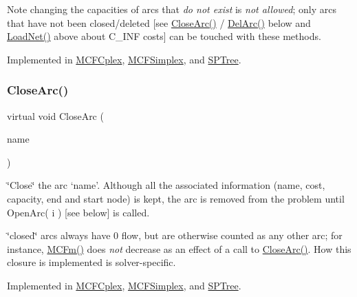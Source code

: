 \begin{DoxyNote}{Note}
changing the capacities of arcs that {\itshape do not exist} is {\itshape not allowed}; only arcs that have not been closed/deleted \mbox{[}see \mbox{\hyperlink{class_m_c_f_class_ae1c33ba491b57343fbc157123fff5b11}{Close\+Arc()}} / \mbox{\hyperlink{class_m_c_f_class_ae291d6625ff31a5fdcc1ef166e2dee34}{Del\+Arc()}} below and \mbox{\hyperlink{class_m_c_f_class_a8d82d26f7845eb69081c860e14c3dc4c}{Load\+Net()}} above about C\+\_\+\+I\+NF costs\mbox{]} can be touched with these methods. 
\end{DoxyNote}


Implemented in \mbox{\hyperlink{class_m_c_f_cplex_a238981895a2a951e54f9dbabd175728f}{M\+C\+F\+Cplex}}, \mbox{\hyperlink{class_m_c_f_simplex_a238981895a2a951e54f9dbabd175728f}{M\+C\+F\+Simplex}}, and \mbox{\hyperlink{class_s_p_tree_a38b4cffe29b722d2552f11022a78227d}{S\+P\+Tree}}.

\mbox{\label{class_m_c_f_class_ae1c33ba491b57343fbc157123fff5b11}} 
\subsubsection{\texorpdfstring{Close\+Arc()}{CloseArc()}}
{\footnotesize\ttfamily virtual void Close\+Arc (\begin{DoxyParamCaption}\item[{\mbox{\hyperlink{class_m_c_f_class_a76aaabb20535c51a2752b93f6c38fe54}{c\+Index}}}]{name }\end{DoxyParamCaption})\hspace{0.3cm}{\ttfamily [pure virtual]}}

\char`\"{}\+Close\char`\"{} the arc `name'. Although all the associated information (name, cost, capacity, end and start node) is kept, the arc is removed from the problem until Open\+Arc( i ) \mbox{[}see below\mbox{]} is called.

\char`\"{}closed\char`\"{} arcs always have 0 flow, but are otherwise counted as any other arc; for instance, \mbox{\hyperlink{class_m_c_f_class_ab4d5a0d0fc49882de0b4eb3146f1b7a6}{M\+C\+Fm()}} does {\itshape not} decrease as an effect of a call to \mbox{\hyperlink{class_m_c_f_class_ae1c33ba491b57343fbc157123fff5b11}{Close\+Arc()}}. How this closure is implemented is solver-\/specific. 

Implemented in \mbox{\hyperlink{class_m_c_f_cplex_a4a964ce79159307998f5acd0018d01b1}{M\+C\+F\+Cplex}}, \mbox{\hyperlink{class_m_c_f_simplex_a4a964ce79159307998f5acd0018d01b1}{M\+C\+F\+Simplex}}, and \mbox{\hyperlink{class_s_p_tree_a4a964ce79159307998f5acd0018d01b1}{S\+P\+Tree}}.

